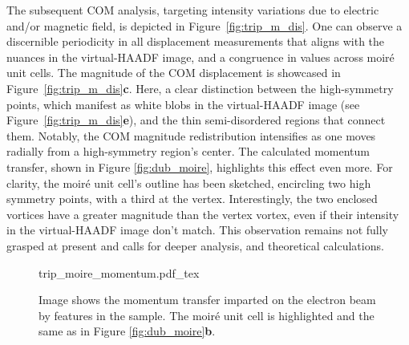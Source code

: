 The subsequent COM analysis, targeting intensity variations due to electric and/or magnetic field, is depicted in Figure~\ref{fig:trip_m_dis}. 
%
One can observe a discernible periodicity in all displacement measurements that aligns with the nuances in the virtual-HAADF image, and a congruence in values across moiré unit cells. 
%
The magnitude of the COM displacement is showcased in Figure~\ref{fig:trip_m_dis}\textbf{c}.
%
Here, a clear distinction between the high-symmetry points, which manifest as white blobs in the virtual-HAADF image (see Figure~\ref{fig:trip_m_dis}\textbf{e}), and the thin semi-disordered regions that connect them.
%
Notably, the COM magnitude redistribution intensifies as one  moves radially from a high-symmetry region's center. 
%
The calculated momentum transfer, shown in Figure \ref{fig:dub_moire}, highlights this effect even more. 
%
For clarity,  the moiré unit cell's outline has been sketched, encircling two high symmetry points, with a third at the vertex. 
%
Interestingly, the two enclosed vortices have a greater magnitude than the vertex vortex, even if their intensity in the virtual-HAADF image don't match. 
%
This observation remains not fully grasped at present and calls for deeper analysis, and theoretical calculations.

\begin{figure}
    \centering
    \def\svgwidth{.9\linewidth}
    {trip_moire_momentum.pdf_tex}
    \caption{Image shows the momentum transfer imparted on the electron beam by features in the sample. The moiré unit cell is highlighted and the same as in Figure \ref{fig:dub_moire}\textbf{b}.}
    \label{fig:trip_m_mom}
\end{figure}
